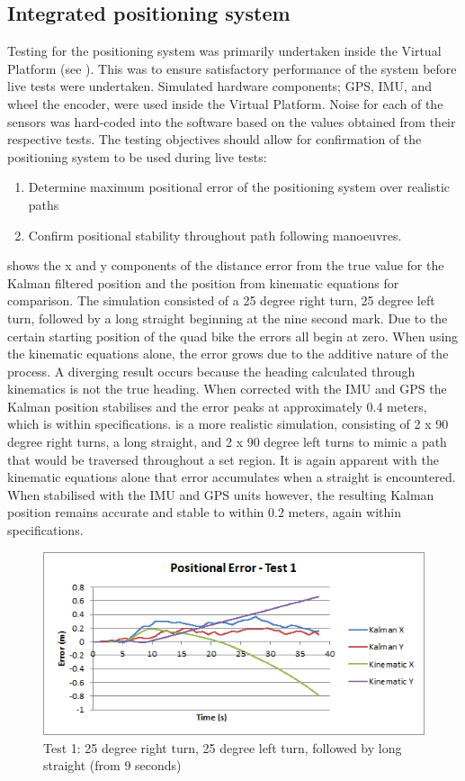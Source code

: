 \documentclass[main.tex]{subfiles}
\begin{document}
\subsection{Integrated positioning system}
Testing for the positioning system was primarily undertaken inside the Virtual Platform (see ). This was to ensure satisfactory performance of the system before live tests were undertaken. Simulated hardware components; GPS, IMU, and wheel the encoder, were used inside the Virtual Platform. Noise for each of the sensors was hard-coded into the software based on the values obtained from their respective tests. The testing objectives should allow for confirmation of the positioning system to be used during live tests:
\begin{enumerate}
\item Determine maximum positional error of the positioning system over realistic paths
\item Confirm positional stability throughout path following manoeuvres.
\end{enumerate}
 shows the x and y components of the distance error from the true value for the Kalman filtered position and the position from kinematic equations for comparison. The simulation consisted of a 25 degree right turn, 25 degree left turn, followed by a long straight beginning at the nine second mark. Due to the certain starting position of the quad bike the errors all begin at zero. When using the kinematic equations alone, the error grows due to the additive nature of the process. A diverging result occurs because the heading calculated through kinematics is not the true heading. When corrected with the IMU and GPS the Kalman position stabilises and the error peaks at approximately 0.4 meters, which is within specifications.  is a more realistic simulation, consisting of 2 x 90 degree right turns, a long straight, and 2 x 90 degree left turns to mimic a path that would be traversed throughout a set region. It is again apparent with the kinematic equations alone that error accumulates when a straight is encountered. When stabilised with the IMU and GPS units however, the resulting Kalman position remains accurate and stable to within 0.2 meters, again within specifications.
\begin{figure}[ht]
\includegraphics[width=\textwidth]{5-Testing/position_error_test_1.png}
\centering
\caption[Positioning system test 1]{Test 1: 25 degree right turn, 25 degree left turn, followed by long straight (from 9 seconds)}
\end{figure}
\end{document}

